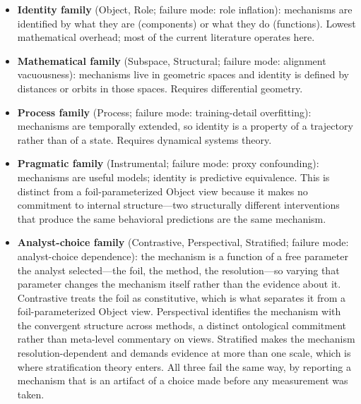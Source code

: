 \documentclass{article}
\begin{document}
\begin{itemize}[leftmargin=*]
\item \textbf{Identity family} (Object, Role; failure mode: role
      inflation): mechanisms are identified
      by what they are (components) or what they do (functions).  Lowest
      mathematical overhead; most of the current literature operates here.
\item \textbf{Mathematical family} (Subspace, Structural; failure mode:
      alignment vacuousness): mechanisms
      live in geometric spaces and identity is defined by distances or
      orbits in those spaces.  Requires differential geometry.
\item \textbf{Process family} (Process; failure mode: training-detail
      overfitting): mechanisms are temporally extended, so identity is a
      property of a trajectory rather than of a state.  Requires dynamical
      systems theory.
\item \textbf{Pragmatic family} (Instrumental; failure mode: proxy
      confounding): mechanisms are useful
      models; identity is predictive equivalence.  This is distinct from a foil-parameterized Object view because it makes no commitment to internal structure---two structurally different interventions that produce the same behavioral predictions are the same mechanism.
\item \textbf{Analyst-choice family} (Contrastive, Perspectival,
      Stratified; failure mode: analyst-choice dependence): the mechanism
      is a function of a free parameter the analyst selected---the foil,
      the method, the resolution---so varying that parameter changes the
      mechanism itself rather than the evidence about it.  Contrastive
      treats the foil as constitutive, which is what separates it from a
      foil-parameterized Object view.  Perspectival identifies the
      mechanism with the convergent structure across methods, a distinct
      ontological commitment rather than meta-level commentary on views.
      Stratified makes the mechanism resolution-dependent and demands
      evidence at more than one scale, which is where stratification
      theory enters.  All three fail the same way, by reporting a
      mechanism that is an artifact of a choice made before any
      measurement was taken.
\end{itemize}
\end{document}
